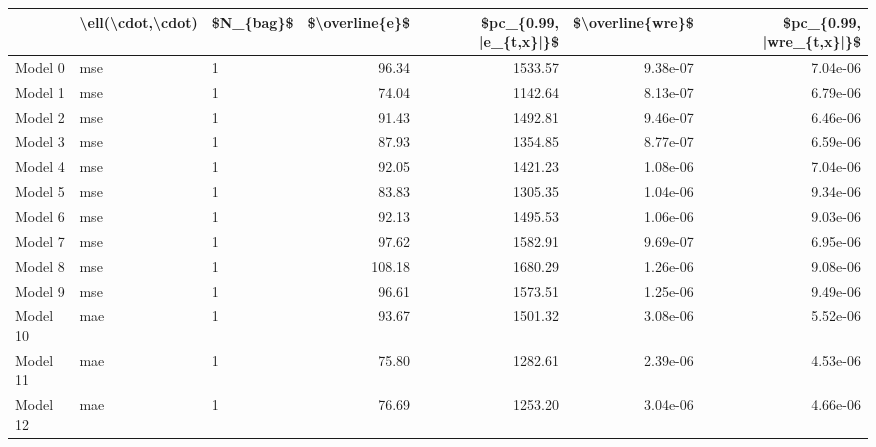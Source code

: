 \begin{tabular}{lllrrrr}
\toprule
{} & \textbackslash ell(\textbackslash cdot,\textbackslash cdot) & \$N\_\{bag\}\$ &  \$\textbackslash overline\{e\}\$ &  \$pc\_\{0.99, |e\_\{t,x\}|\}\$ &  \$\textbackslash overline\{wre\}\$ &  \$pc\_\{0.99, |wre\_\{t,x\}|\}\$ \\
\midrule
Model 0    &               mse &         1 &           96.34 &                 1533.57 &          9.38e-07 &                  7.04e-06 \\
Model 1    &               mse &         1 &           74.04 &                 1142.64 &          8.13e-07 &                  6.79e-06 \\
Model 2    &               mse &         1 &           91.43 &                 1492.81 &          9.46e-07 &                  6.46e-06 \\
Model 3    &               mse &         1 &           87.93 &                 1354.85 &          8.77e-07 &                  6.59e-06 \\
Model 4    &               mse &         1 &           92.05 &                 1421.23 &          1.08e-06 &                  7.04e-06 \\
Model 5    &               mse &         1 &           83.83 &                 1305.35 &          1.04e-06 &                  9.34e-06 \\
Model 6    &               mse &         1 &           92.13 &                 1495.53 &          1.06e-06 &                  9.03e-06 \\
Model 7    &               mse &         1 &           97.62 &                 1582.91 &          9.69e-07 &                  6.95e-06 \\
Model 8    &               mse &         1 &          108.18 &                 1680.29 &          1.26e-06 &                  9.08e-06 \\
Model 9    &               mse &         1 &           96.61 &                 1573.51 &          1.25e-06 &                  9.49e-06 \\
Model 10   &               mae &         1 &           93.67 &                 1501.32 &          3.08e-06 &                  5.52e-06 \\
Model 11   &               mae &         1 &           75.80 &                 1282.61 &          2.39e-06 &                  4.53e-06 \\
Model 12   &               mae &         1 &           76.69 &                 1253.20 &          3.04e-06 &                  4.66e-06 \\

\end{tabular}
